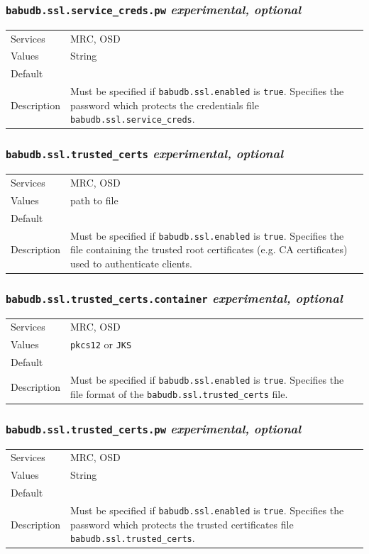 \documentclass[a4paper,10pt]{book}
\begin{document}
\subsubsection{\texttt{babudb.ssl.service\_creds.pw} \textit{experimental, optional}}
\begin{tabular}{lp{10cm}}
 Services & MRC, OSD\\
 Values   & String\\
 Default  & \\
 Description & Must be specified if \texttt{babudb.ssl.enabled} is \texttt{true}. Specifies the password which protects the credentials file \texttt{babudb.ssl.service\_creds}.
\end{tabular}

\subsubsection{\texttt{babudb.ssl.trusted\_certs} \textit{experimental, optional}}
\begin{tabular}{lp{10cm}}
 Services & MRC, OSD\\
 Values   & path to file\\
 Default  & \\
 Description & Must be specified if \texttt{babudb.ssl.enabled} is \texttt{true}. Specifies the file containing the trusted root certificates (e.g. CA certificates) used to authenticate clients.
\end{tabular}

\subsubsection{\texttt{babudb.ssl.trusted\_certs.container} \textit{experimental, optional}}
\begin{tabular}{lp{10cm}}
 Services & MRC, OSD\\
 Values   & \texttt{pkcs12} or \texttt{JKS}\\
 Default  & \\
 Description & Must be specified if \texttt{babudb.ssl.enabled} is \texttt{true}. Specifies the file format of the \texttt{babudb.ssl.trusted\_certs} file.
\end{tabular}

\subsubsection{\texttt{babudb.ssl.trusted\_certs.pw} \textit{experimental, optional}}
\begin{tabular}{lp{10cm}}
 Services & MRC, OSD\\
 Values   & String\\
 Default  & \\
 Description & Must be specified if \texttt{babudb.ssl.enabled} is \texttt{true}. Specifies the password which protects the trusted certificates file \texttt{babudb.ssl.trusted\_certs}.
\end{tabular}
\end{document}
